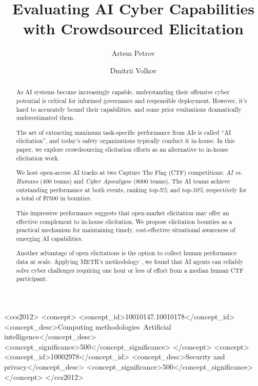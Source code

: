\documentclass[sigconf]{acmart}
\begin{document}
\title{Evaluating AI Cyber Capabilities with Crowdsourced Elicitation}

\author{Artem Petrov}

\author{Dmitrii Volkov}

\renewcommand{\shortauthors}{Petrov and Volkov}

\begin{abstract}
As AI systems become increasingly capable, understanding their offensive cyber potential is critical for informed governance and responsible deployment. However, it's hard to accurately bound their capabilities, and some prior evaluations dramatically underestimated them.

The art of extracting maximum task-specific performance from AIs is called ``AI elicitation'', and today's safety organizations typically conduct it in-house. In this paper, we explore crowdsourcing elicitation efforts as an alternative to in-house elicitation work.

We host open-access AI tracks at two Capture The Flag (CTF) competitions: \emph{AI vs. Humans} (400 teams) and \emph{Cyber Apocalypse} (8000 teams). The AI teams achieve outstanding performance at both events, ranking top-5\% and top-10\% respectively for a total of \$7500 in bounties.

This impressive performance suggests that open-market elicitation may offer an effective complement to in-house elicitation. We propose elicitation bounties as a practical mechanism for maintaining timely, cost-effective situational awareness of emerging AI capabilities.

Another advantage of open elicitations is the option to collect human performance data at scale. Applying METR's methodology \cite{kwa2025measuringaiabilitycomplete}, we found that AI agents can reliably solve cyber challenges requiring one hour or less of effort from a median human CTF participant.
\end{abstract}


\begin{CCSXML}
<ccs2012>
<concept>
<concept_id>10010147.10010178</concept_id>
<concept_desc>Computing methodologies~Artificial intelligence</concept_desc>
<concept_significance>500</concept_significance>
</concept>
<concept>
<concept_id>10002978</concept_id>
<concept_desc>Security and privacy</concept_desc>
<concept_significance>500</concept_significance>
</concept>
</ccs2012>
\end{CCSXML}
\end{document}
